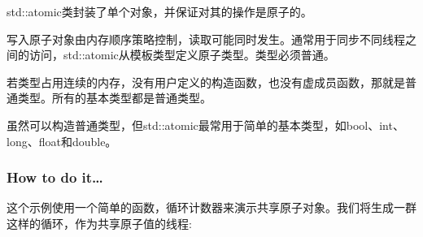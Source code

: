 
std::atomic类封装了单个对象，并保证对其的操作是原子的。

写入原子对象由内存顺序策略控制，读取可能同时发生。通常用于同步不同线程之间的访问，std::atomic从模板类型定义原子类型。类型必须普通。

若类型占用连续的内存，没有用户定义的构造函数，也没有虚成员函数，那就是普通类型。所有的基本类型都是普通类型。

虽然可以构造普通类型，但std::atomic最常用于简单的基本类型，如bool、int、long、float和double。

\subsubsection{How to do it…}

这个示例使用一个简单的函数，循环计数器来演示共享原子对象。我们将生成一群这样的循环，作为共享原子值的线程:

